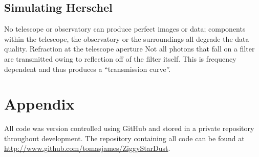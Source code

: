 \documentclass{report}
\begin{document}
\subsection{Simulating Herschel}
No telescope or observatory can produce perfect images or data; components within the telescope, the observatory or the surroundings all degrade the data quality. Refraction at the telescope aperture  Not all photons that fall on a filter are transmitted owing to reflection off of the filter itself. This is frequency dependent and thus produces a ``transmission curve''.

\section{Appendix}
All code was version controlled using GitHub and stored in a private repository throughout development. The repository containing all code can be found at \href{http://www.github.com/tomasjames/ZiggyStarDust}{http://www.github.com/tomasjames/ZiggyStarDust}.


\printbibliography


\end{document}
